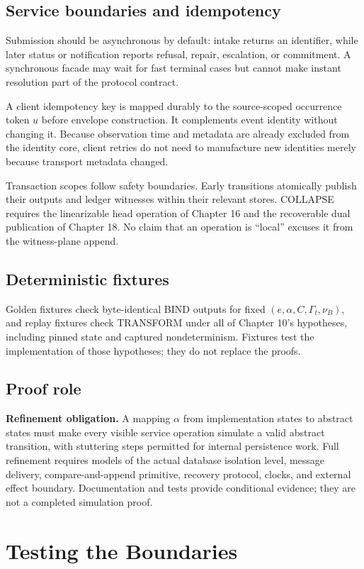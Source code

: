 \documentclass[11pt,openany]{book}
\begin{document}
\section{Service boundaries and idempotency}
Submission should be asynchronous by default: intake returns an identifier,
while later status or notification reports refusal, repair, escalation, or
commitment. A synchronous facade may wait for fast terminal cases but cannot
make instant resolution part of the protocol contract.

A client idempotency key is mapped durably to the source-scoped occurrence
token \(u\) before envelope construction. It complements event identity without
changing it. Because observation time and metadata are already excluded from
the identity core, client retries do not need to manufacture new identities
merely because transport metadata changed.

Transaction scopes follow safety boundaries. Early transitions atomically
publish their outputs and ledger witnesses within their relevant stores.
COLLAPSE requires the linearizable head operation of Chapter 16 and the
recoverable dual publication of Chapter 18. No claim that an operation is
“local” excuses it from the witness-plane append.

\section{Deterministic fixtures}
Golden fixtures check byte-identical BIND outputs for fixed
\((e,\alpha,C,\Gamma_t,\nu_B)\), and replay fixtures check TRANSFORM under all
of Chapter 10's hypotheses, including pinned state and captured nondeterminism.
Fixtures test the implementation of those hypotheses; they do not replace the
proofs.

\section{Proof role}
\textbf{Refinement obligation.} A mapping \(\alpha\) from implementation states
to abstract states must make every visible service operation simulate a valid
abstract transition, with stuttering steps permitted for internal persistence
work. Full refinement requires models of the actual database isolation level,
message delivery, compare-and-append primitive, recovery protocol, clocks, and
external effect boundary. Documentation and tests provide conditional evidence;
they are not a completed simulation proof.

\chapter{Testing the Boundaries}
\end{document}
